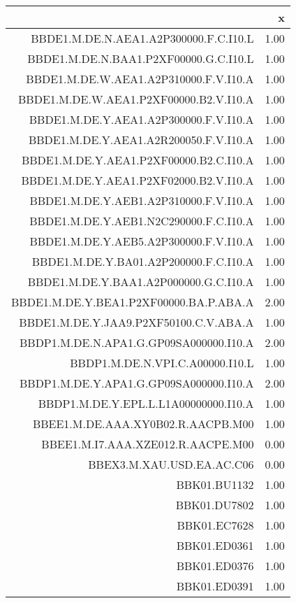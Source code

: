 \begin{table}[ht]
\centering
\begin{tabular}{rr}
  \hline
 & x \\ 
  \hline
BBDE1.M.DE.N.AEA1.A2P300000.F.C.I10.L & 1.00 \\ 
  BBDE1.M.DE.N.BAA1.P2XF00000.G.C.I10.L & 1.00 \\ 
  BBDE1.M.DE.W.AEA1.A2P310000.F.V.I10.A & 1.00 \\ 
  BBDE1.M.DE.W.AEA1.P2XF00000.B2.V.I10.A & 1.00 \\ 
  BBDE1.M.DE.Y.AEA1.A2P300000.F.V.I10.A & 1.00 \\ 
  BBDE1.M.DE.Y.AEA1.A2R200050.F.V.I10.A & 1.00 \\ 
  BBDE1.M.DE.Y.AEA1.P2XF00000.B2.C.I10.A & 1.00 \\ 
  BBDE1.M.DE.Y.AEA1.P2XF02000.B2.V.I10.A & 1.00 \\ 
  BBDE1.M.DE.Y.AEB1.A2P310000.F.V.I10.A & 1.00 \\ 
  BBDE1.M.DE.Y.AEB1.N2C290000.F.C.I10.A & 1.00 \\ 
  BBDE1.M.DE.Y.AEB5.A2P300000.F.V.I10.A & 1.00 \\ 
  BBDE1.M.DE.Y.BA01.A2P200000.F.C.I10.A & 1.00 \\ 
  BBDE1.M.DE.Y.BAA1.A2P000000.G.C.I10.A & 1.00 \\ 
  BBDE1.M.DE.Y.BEA1.P2XF00000.BA.P.ABA.A & 2.00 \\ 
  BBDE1.M.DE.Y.JAA9.P2XF50100.C.V.ABA.A & 1.00 \\ 
  BBDP1.M.DE.N.APA1.G.GP09SA000000.I10.A & 2.00 \\ 
  BBDP1.M.DE.N.VPI.C.A00000.I10.L & 1.00 \\ 
  BBDP1.M.DE.Y.APA1.G.GP09SA000000.I10.A & 2.00 \\ 
  BBDP1.M.DE.Y.EPL.L.L1A00000000.I10.A & 1.00 \\ 
  BBEE1.M.DE.AAA.XY0B02.R.AACPB.M00 & 1.00 \\ 
  BBEE1.M.I7.AAA.XZE012.R.AACPE.M00 & 0.00 \\ 
  BBEX3.M.XAU.USD.EA.AC.C06 & 0.00 \\ 
  BBK01.BU1132 & 1.00 \\ 
  BBK01.DU7802 & 1.00 \\ 
  BBK01.EC7628 & 1.00 \\ 
  BBK01.ED0361 & 1.00 \\ 
  BBK01.ED0376 & 1.00 \\ 
  BBK01.ED0391 & 1.00 \\ 

\end{tabular}
\end{table}
